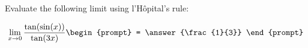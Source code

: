 \documentclass{ximera}
\author{Steven Gubkin}
\begin{document}
\begin{exercise}

Evaluate the following limit using l'H\^{o}pital's rule:

\[
\lim_{x \to 0} \frac{\tan(\sin(x))}{\tan(3x)} \begin{prompt} = \answer{\frac{1}{3}} \end{prompt}
\]

\end{exercise}
\end{document}
